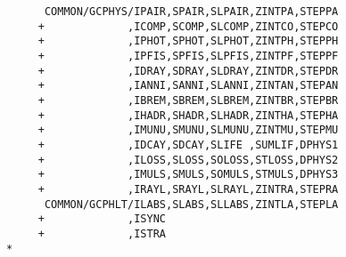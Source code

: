 \begin{verbatim}
      COMMON/GCPHYS/IPAIR,SPAIR,SLPAIR,ZINTPA,STEPPA
     +             ,ICOMP,SCOMP,SLCOMP,ZINTCO,STEPCO
     +             ,IPHOT,SPHOT,SLPHOT,ZINTPH,STEPPH
     +             ,IPFIS,SPFIS,SLPFIS,ZINTPF,STEPPF
     +             ,IDRAY,SDRAY,SLDRAY,ZINTDR,STEPDR
     +             ,IANNI,SANNI,SLANNI,ZINTAN,STEPAN
     +             ,IBREM,SBREM,SLBREM,ZINTBR,STEPBR
     +             ,IHADR,SHADR,SLHADR,ZINTHA,STEPHA
     +             ,IMUNU,SMUNU,SLMUNU,ZINTMU,STEPMU
     +             ,IDCAY,SDCAY,SLIFE ,SUMLIF,DPHYS1
     +             ,ILOSS,SLOSS,SOLOSS,STLOSS,DPHYS2
     +             ,IMULS,SMULS,SOMULS,STMULS,DPHYS3
     +             ,IRAYL,SRAYL,SLRAYL,ZINTRA,STEPRA
      COMMON/GCPHLT/ILABS,SLABS,SLLABS,ZINTLA,STEPLA
     +             ,ISYNC
     +             ,ISTRA
*
\end{verbatim}
